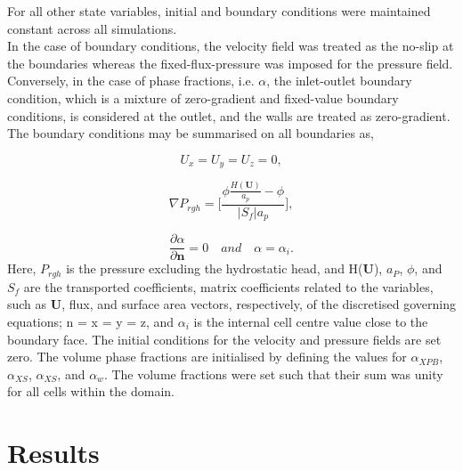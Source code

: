 For all other state variables, initial and boundary conditions were maintained constant across all simulations.\\

In the case of boundary conditions, the velocity field was treated as the no-slip at the boundaries whereas the fixed-flux-pressure was imposed for the pressure field. Conversely, in the case of phase fractions, i.e. ${\alpha}$, the inlet-outlet boundary condition, which is a mixture of zero-gradient and fixed-value boundary conditions, is considered at the outlet, and the walls are treated as zero-gradient. The boundary conditions may be summarised on all boundaries as,  

\begin{equation}
    \label{eq:boundaryU}
    U_x = U_y = U_z = 0,
\end{equation}

\begin{equation}
    \label{eq:boundaryPrgh}
    \nabla P_{rgh} = \bigg[\frac{\phi \frac{H(\mathbf{U})}{a_p} - \phi}{|S_f|a_p} \bigg],
\end{equation}

\begin{equation}
    \label{eq:boundaryAlpha}
    \frac{\partial \alpha}{\partial \mathbf{n}} = 0 \quad {and} \quad \alpha = \alpha_i.
\end{equation}
Here, ${P_{rgh}}$ is the pressure excluding the hydrostatic head, and H(\textbf{U}), ${a_P}$, ${\phi}$, and ${S_f}$ are the transported coefficients, matrix coefficients related to the variables, such as \textbf{U}, flux, and surface area vectors, respectively, of the discretised governing equations; n = x = y = z, and ${\alpha_i}$ is the internal cell centre value close to the boundary face. The initial conditions for the velocity and pressure fields are set zero. The volume phase fractions are initialised by defining the values for $\alpha_{{XPB}}$, $\alpha_{{XS}}$, $\alpha_{{XS}}$, and $\alpha_{{w}}$. The volume fractions were set such that their sum was unity for all cells within the domain. 


\section{Results}


